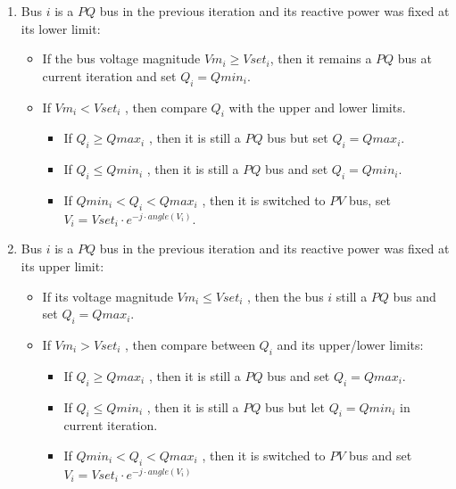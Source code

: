 \documentclass[nols,a4paper,twoside,symmetric,notoc,fleqn]{tufte-book}
\begin{document}
\begin{enumerate}
	\item Bus $i$ is a $PQ$ bus in the previous iteration and its
	reactive power was fixed at its lower limit:
	
	\begin{itemize}
		\item If the bus voltage magnitude $Vm_i \geq Vset_i$, then it remains a $PQ$ bus at current iteration and set $Q_i = Qmin_i$.
		
		\item If $Vm_i < Vset_i$ , then compare $Q_i$ with the upper and lower limits.
		
		\begin{itemize}
			\item If $Q_i \geq Qmax_i$ , then it is still a $PQ$ bus but set $Q_i = Qmax_i$.
			
			\item If $Q_i \leq Qmin_i$ , then it is still a $PQ$ bus and set $Q_i = Qmin_i$.
			
			\item If $Qmin_i < Q_i < Qmax_i$ , then it is switched to $PV$ bus, set $V_i = Vset_i \cdot e^{-j \cdot angle(V_i)}$.
		\end{itemize}
	\end{itemize}
	
	
	\item Bus $i$ is a $PQ$ bus in the previous iteration and its reactive power was fixed at its upper limit:
	
	\begin{itemize}
		\item If its voltage magnitude $Vm_i \leq Vset_i$ , then the bus $i$ still a $PQ$ bus and set $Q_i = Qmax_i$.
	
		\item If $Vm_i > Vset_i$ , then compare between $Q_i$ and its upper/lower limits:
	
		\begin{itemize}
			\item If $Q_i \geq Qmax_i$ , then it is still a $PQ$ bus and set $Q_i = Qmax_i$.
			\item If $Q_i \leq Qmin_i$ , then it is still a $PQ$ bus but let $Q_i = Qmin_i$ in current iteration.
			\item If $Qmin_i < Q_i < Qmax_i$ , then it is switched to $PV$ bus and set $V_i = Vset_i \cdot e^{-j \cdot angle(V_i)}$
		\end{itemize}
	\end{itemize}
	

\end{enumerate}
\end{document}
